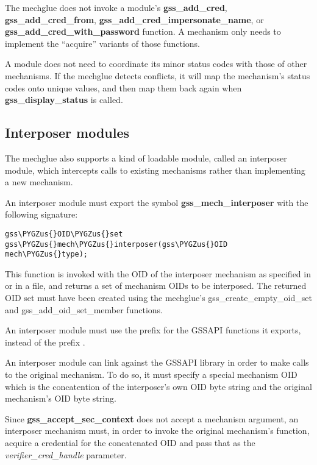 \documentclass[letterpaper,10pt,english]{sphinxmanual}
\def\PYGZus{\char`\_}
\begin{document}
The mechglue does not invoke a module's \textbf{gss\_add\_cred},
\textbf{gss\_add\_cred\_from}, \textbf{gss\_add\_cred\_impersonate\_name}, or
\textbf{gss\_add\_cred\_with\_password} function.  A mechanism only needs to
implement the ``acquire'' variants of those functions.

A module does not need to coordinate its minor status codes with those
of other mechanisms.  If the mechglue detects conflicts, it will map
the mechanism's status codes onto unique values, and then map them
back again when \textbf{gss\_display\_status} is called.


\subsection{Interposer modules}
\label{plugindev/gssapi:interposer-modules}
The mechglue also supports a kind of loadable module, called an
interposer module, which intercepts calls to existing mechanisms
rather than implementing a new mechanism.

An interposer module must export the symbol \textbf{gss\_mech\_interposer}
with the following signature:

\begin{Verbatim}[commandchars=\\\{\}]
gss\PYGZus{}OID\PYGZus{}set gss\PYGZus{}mech\PYGZus{}interposer(gss\PYGZus{}OID mech\PYGZus{}type);
\end{Verbatim}

This function is invoked with the OID of the interposer mechanism as
specified in  or in a 
file, and returns a set of mechanism OIDs to be interposed.  The
returned OID set must have been created using the mechglue's
gss\_create\_empty\_oid\_set and gss\_add\_oid\_set\_member functions.

An interposer module must use the prefix  for the GSSAPI
functions it exports, instead of the prefix .

An interposer module can link against the GSSAPI library in order to
make calls to the original mechanism.  To do so, it must specify a
special mechanism OID which is the concatention of the interposer's
own OID byte string and the original mechanism's OID byte string.

Since \textbf{gss\_accept\_sec\_context} does not accept a mechanism argument,
an interposer mechanism must, in order to invoke the original
mechanism's function, acquire a credential for the concatenated OID
and pass that as the \emph{verifier\_cred\_handle} parameter.
\end{document}

